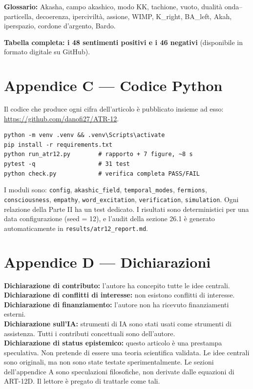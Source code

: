 \textbf{Glossario:} Akasha, campo akashico, modo KK, tachione, vuoto, dualità onda--particella, decoerenza, iperciviltà, assione, WIMP, K\_right, BA\_left, Akah, iperspazio, cordone d'argento, Bardo.

\textbf{Tabella completa: i 48 sentimenti positivi e i 46 negativi} (disponibile in formato digitale su GitHub).

\section{Appendice C --- Codice Python}
Il codice che produce ogni cifra dell'articolo è pubblicato insieme ad esso: \url{https://github.com/danofi27/ATR-12}.

\begin{verbatim}
python -m venv .venv && .venv\Scripts\activate
pip install -r requirements.txt
python run_atr12.py        # rapporto + 7 figure, ~8 s
pytest -q                  # 31 test
python check.py            # verifica completa PASS/FAIL
\end{verbatim}

I moduli sono: \texttt{config}, \texttt{akashic\_field}, \texttt{temporal\_modes}, \texttt{fermions}, \texttt{consciousness}, \texttt{empathy}, \texttt{word\_excitation}, \texttt{verification}, \texttt{simulation}. Ogni relazione della Parte II ha un test dedicato. I risultati sono deterministici per una data configurazione (seed = 12), e l'audit della sezione 26.1 è generato automaticamente in \texttt{results/atr12\_report.md}.

\section{Appendice D --- Dichiarazioni}
\textbf{Dichiarazione di contributo:} l'autore ha concepito tutte le idee centrali. \\
\textbf{Dichiarazione di conflitti di interesse:} non esistono conflitti di interesse. \\
\textbf{Dichiarazione di finanziamento:} l'autore non ha ricevuto finanziamenti esterni. \\
\textbf{Dichiarazione sull'IA:} strumenti di IA sono stati usati come strumenti di assistenza. Tutti i contributi concettuali sono dell'autore. \\
\textbf{Dichiarazione di status epistemico:} questo articolo è una prestampa speculativa. Non pretende di essere una teoria scientifica validata. Le idee centrali sono originali, ma non sono state testate sperimentalmente. Le sezioni dell'appendice A sono speculazioni filosofiche, non derivate dalle equazioni di ART-12D. Il lettore è pregato di trattarle come tali.

